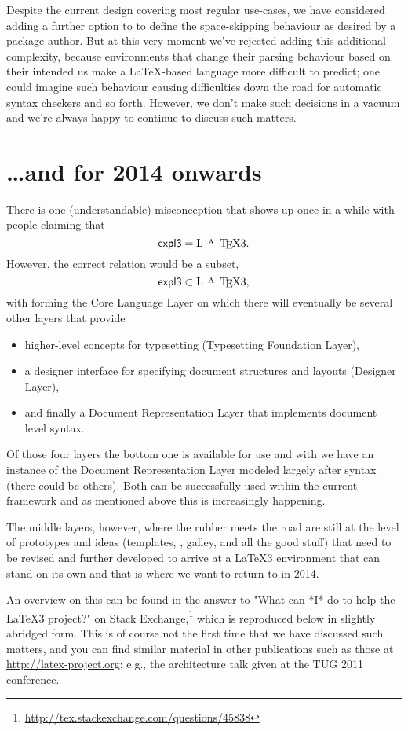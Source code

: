 \documentclass{ltnews}
\begin{document}
Despite the current design covering most regular use-cases, we have considered adding a further option to  to define the space-skipping behaviour as desired by a package author.
But at this very moment we've rejected adding this additional complexity, because environments that change their parsing behaviour based on their intended us make a \LaTeX-based language more difficult to predict; one could imagine such behaviour causing difficulties down the road for automatic syntax checkers and so forth.
However, we don't make such decisions in a vacuum and we're always happy to continue to discuss such matters.


\section{\ldots and for 2014 onwards}

There is one (understandable) misconception that shows up once in a while with people claiming that
\[
         \textrm{\pkg{expl3}} = \textrm{\LaTeX3}.
\]
However, the correct relation would be a subset,
\[
         \textrm{\pkg{expl3}} \subset \textrm{\LaTeX3},
\]
with  forming the Core Language Layer on which  there will eventually be several other layers that \mbox{provide} 
\begin{itemize}
\item higher-level concepts for typesetting (Typesetting Foundation Layer), 
\item a designer interface for specifying document structures and layouts (Designer Layer), 
\item and finally a Document Representation Layer that implements document level syntax.
\end{itemize}
Of those four layers the bottom one  is available for use and with  we have an instance of the Document Representation Layer modeled largely after \LaTeXe{} syntax (there could be others). Both can be successfully used within the current \LaTeXe{} framework and as mentioned above this is increasingly happening.

The middle layers, however, where the rubber meets the road are still  at the level of prototypes and ideas (templates, , galley,  and all the good stuff) that need to be revised and further developed to arrive at a \LaTeX3 environment that can stand on its own and that is where we want to return to in 2014.

An overview on this can be found in the answer to "What can *I* do to help the \LaTeX3 project?" on Stack Exchange,\footnote{\url{http://tex.stackexchange.com/questions/45838}}
which is reproduced below in slightly abridged form.
This is of course not the first time that we have discussed such matters, and you can find similar material in other publications such as those at \url{http://latex-project.org}; e.g., the architecture talk given at the TUG 2011 conference.
\end{document}
